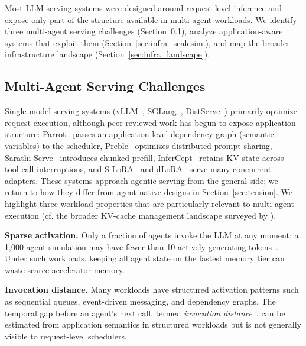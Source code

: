 Most LLM serving systems were designed around request-level inference and expose only part of the structure available in multi-agent workloads. We identify three multi-agent serving challenges (Section~\ref{sec:infra_challenges}), analyze application-aware systems that exploit them (Section~\ref{sec:infra_scalesim}), and map the broader infrastructure landscape (Section~\ref{sec:infra_landscape}).

\subsection{Multi-Agent Serving Challenges}\label{sec:infra_challenges}

Single-model serving systems (vLLM~\cite{kwon2023}, SGLang~\cite{sglang2024}, DistServe~\cite{distserve2024}) primarily optimize request execution, although peer-reviewed work has begun to expose application structure: Parrot~\cite{parrot2024} passes an application-level dependency graph (semantic variables) to the scheduler, Preble~\cite{preble2025} optimizes distributed prompt sharing, Sarathi-Serve~\cite{sarathi2024} introduces chunked prefill, InferCept~\cite{infercept2024} retains KV state across tool-call interruptions, and S-LoRA~\cite{slora2024} and dLoRA~\cite{dlora2024} serve many concurrent adapters. These systems approach agentic serving from the general side; we return to how they differ from agent-native designs in Section~\ref{sec:tension}. We highlight three workload properties that are particularly relevant to multi-agent execution (cf. the broader KV-cache management landscape surveyed by \cite{kvcachesurvey2026}).

\textbf{Sparse activation.} Only a fraction of agents invoke the LLM at any moment: a 1,000-agent simulation may have fewer than 10 actively generating tokens~\cite{zhou2026}. Under such workloads, keeping all agent state on the fastest memory tier can waste scarce accelerator memory.

\textbf{Invocation distance.} Many workloads have structured activation patterns such as sequential queues, event-driven messaging, and dependency graphs. The temporal gap before an agent's next call, termed \emph{invocation distance}~\cite{zhou2026}, can be estimated from application semantics in structured workloads but is not generally visible to request-level schedulers.

